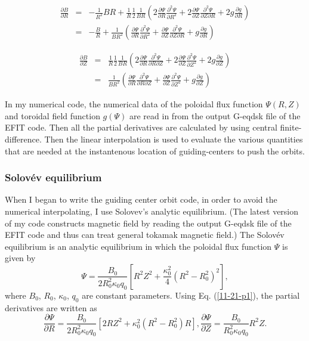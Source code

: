 \documentclass{article}
\begin{document}
\begin{eqnarray}
  \frac{\partial B}{\partial R} & = & - \frac{1}{R^2} B R + \frac{1}{R} 
  \frac{1}{2}  \frac{1}{B R} \left( 2 \frac{\partial \Psi}{\partial R} 
  \frac{\partial^2 \Psi}{\partial R^2} + 2 \frac{\partial \Psi}{\partial Z} 
  \frac{\partial^2 \Psi}{\partial Z \partial R} + 2 g \frac{\partial
  g}{\partial R} \right) \nonumber\\
  & = & - \frac{B}{R} + \frac{1}{B R^2} \left( \frac{\partial \Psi}{\partial
  R}  \frac{\partial^2 \Psi}{\partial R^2} + \frac{\partial \Psi}{\partial Z} 
  \frac{\partial^2 \Psi}{\partial Z \partial R} + g \frac{\partial g}{\partial
  R} \right) 
\end{eqnarray}

\begin{eqnarray}
  \frac{\partial B}{\partial Z} & = & \frac{1}{R} \frac{1}{2}  \frac{1}{B R}
  \left( 2 \frac{\partial \Psi}{\partial R}  \frac{\partial^2 \Psi}{\partial R
  \partial Z} + 2 \frac{\partial \Psi}{\partial Z}  \frac{\partial^2
  \Psi}{\partial Z^2} + 2 g \frac{\partial g}{\partial Z} \right) \nonumber\\
  & = &  \frac{1}{B R^2} \left( \frac{\partial \Psi}{\partial R} 
  \frac{\partial^2 \Psi}{\partial R \partial Z} + \frac{\partial
  \Psi}{\partial Z}  \frac{\partial^2 \Psi}{\partial Z^2} + g \frac{\partial
  g}{\partial Z} \right) 
\end{eqnarray}


In my numerical code, the numerical data of the poloidal flux function $\Psi
(R, Z)$ and toroidal field function $g (\Psi)$ are read in from the output
G-eqdsk file of the EFIT code. Then all the partial derivatives are calculated
by using central finite-difference. Then the linear interpolation is used to
evaluate the various quantities that are needed at the instantenous location
of guiding-centers to push the orbits.

\subsubsection{Solov{\'e}v equilibrium}

When I began to write the guiding center orbit code, in order to avoid the
numerical interpolating, I use Solovev's analytic equilibrium. (The latest
version of my code constructs magnetic field by reading the output G-eqdsk
file of the EFIT code and thus can treat general tokamak magnetic field.) The
Solov{\'e}v equilibrium is an analytic equilibrium in which the poloidal flux
function $\Psi$ is given by
\begin{equation}
  \label{11-21-p1} \Psi = \frac{B_0}{2 R_0^2 \kappa_0 q_0} \left[ R^2 Z^2 +
  \frac{\kappa_0^2}{4} (R^2 - R_0^2)^2 \right],
\end{equation}
where $B_0$, $R_0$, $\kappa_0$, $q_0$ are constant parameters. Using Eq.
(\ref{11-21-p1}), the partial derivatives are written as
\begin{equation}
  \frac{\partial \Psi}{\partial R} = \frac{B_0}{2 R_0^2 \kappa_0 q_0} [2 R Z^2
  + \kappa_0^2 (R^2 - R_0^2) R], \frac{\partial \Psi}{\partial Z} =
  \frac{B_0}{R_0^2 \kappa_0 q_0} R^2 Z.
\end{equation}
\end{document}
